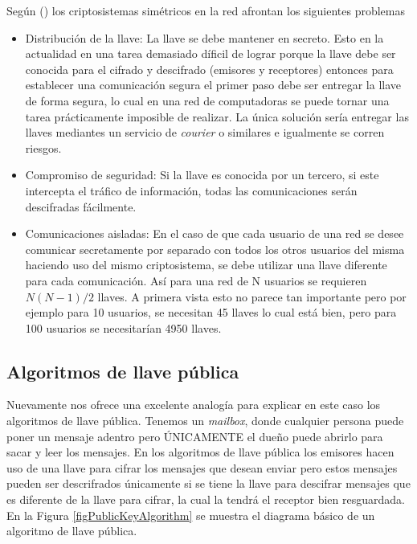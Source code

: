Según (\cite{bruce}) los criptosistemas simétricos en la red afrontan los siguientes problemas
\begin{itemize}
\item Distribución de la llave: La llave se debe mantener en secreto. Esto en la actualidad en una tarea demasiado díficil de lograr porque la llave debe ser conocida para el cifrado y descifrado (emisores y receptores) entonces para establecer una comunicación segura el primer paso debe ser entregar la llave de forma segura, lo cual en una red de computadoras se puede tornar una tarea prácticamente imposible de realizar. La única solución sería entregar las llaves mediantes un servicio de \textit{courier} o similares e igualmente se corren riesgos. 

\item Compromiso de seguridad: Si la llave es conocida por un tercero, si este intercepta el tráfico de información, todas las comunicaciones serán descifradas fácilmente.

\item Comunicaciones aisladas: En el caso de que cada usuario de una red se desee comunicar secretamente por separado con todos los otros usuarios del misma haciendo uso del mismo criptosistema, se debe utilizar una llave diferente para cada comunicación. Así para una red de N usuarios se requieren $N(N - 1)/2$ llaves. A primera vista esto no parece tan importante pero por ejemplo para 10 usuarios, se necesitan 45 llaves lo cual está bien, pero para 100 usuarios se necesitarían 4950 llaves.
\end{itemize}



\subsection{Algoritmos de llave pública}
Nuevamente \cite{bruce} nos ofrece una excelente analogía para explicar en este caso los algoritmos de llave pública. Tenemos un \textit{mailbox}, donde cualquier persona puede poner un mensaje adentro pero ÚNICAMENTE el dueño puede abrirlo para sacar y leer los mensajes.
\newline
\newline
En los algoritmos de llave pública los emisores hacen uso de una llave para cifrar los mensajes que desean enviar pero estos mensajes pueden ser descrifrados únicamente si se tiene la llave para descifrar mensajes que es diferente de la llave para cifrar, la cual la tendrá el receptor bien resguardada. En la Figura \ref{figPublicKeyAlgorithm} se muestra el diagrama básico de un algoritmo de llave pública.


